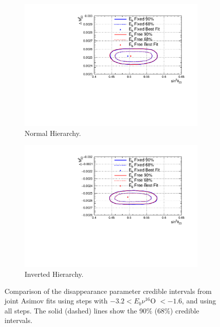 \begin{figure}
\centering
\begin{subfigure}{.7\textwidth}
  \centering
  \includegraphics[width=0.95\linewidth]{figs/comparedmach3contours_Eb_m1.6_3.2/comparedmach3contours_RCeff_asimovA_NH}
  \caption{Normal Hierarchy.}
  \label{fig:EBDisNH}
\end{subfigure}
\begin{subfigure}{.7\textwidth}
  \centering
  \includegraphics[width=0.95\linewidth]{figs/comparedmach3contours_Eb_m1.6_3.2/comparedmach3contours_RCeff_asimovA_IH}
  \caption{Inverted Hierarchy.}
  \label{fig:EBDisIH}
\end{subfigure}
\caption{Comparison of the disappearance parameter credible intervals from joint Asimov fits using steps with $ -3.2 < E_b \nu ^{16}$O $< -1.6$, and using all steps. The solid (dashed) lines show the 90$\%$ ($68\%$) credible intervals.}
\label{fig:EBDis}
\end{figure}

